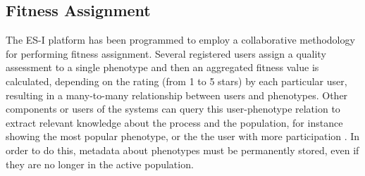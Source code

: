 \subsection{Fitness Assignment}
\label{sec:assignment}
The ES-I platform has been programmed to employ a collaborative methodology for performing fitness
 assignment. Several registered users assign a quality assessment to a single
phenotype and then an aggregated fitness value is calculated,
depending on the rating (from 1 to 5 stars) by each particular user,  %
resulting in a many-to-many relationship between users and
phenotypes. 
Other components or users of the systems can 
query this user-phenotype relation to extract relevant
knowledge about the process and the population, for instance showing the
most popular phenotype, or the the user with more participation 
\cite{picbreeder}.
In order to do this, metadata about phenotypes 
must be permanently stored, even
if they are no longer in the active population. 

